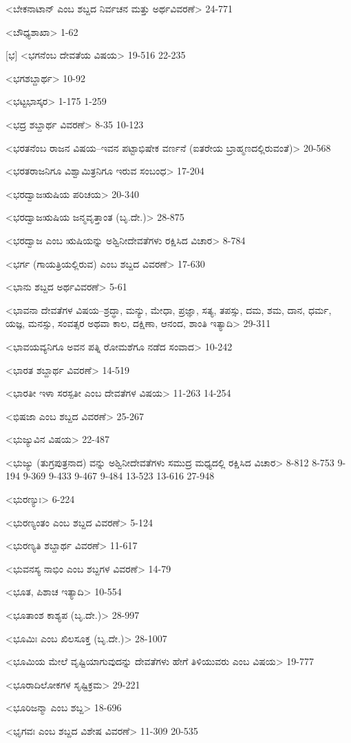 <ಬೇಕನಾಟಾನ್‍ ಎಂಬ ಶಬ್ದದ ನಿರ್ವಚನ ಮತ್ತು ಅರ್ಥವಿವರಣೆ>
24-771

<ಬೌಧ್ಯಶಾಖಾ>
1-62

[ಭ]
<ಭಗನೆಂಬ ದೇವತೆಯ ವಿಷಯ>
19-516 
22-235

<ಭಗಶಬ್ದಾರ್ಥ>
10-92

<ಭಟ್ಟಭಾಸ್ಕರ>
1-175
1-259

<ಭದ್ರ ಶಬ್ದಾರ್ಥ ವಿವರಣೆ>
8-35
10-123

<ಭರತನೆಂಬ ರಾಜನ ವಿಷಯ–ಇವನ ಪಟ್ಟಾಭಿಷೇಕ ವರ್ಣನೆ (ಐತರೇಯ ಬ್ರಾಹ್ಮಣದಲ್ಲಿರುವಂತೆ)>
20-568

<ಭರತರಾಜನಿಗೂ ವಿಶ್ವಾಮಿತ್ರನಿಗೂ ಇರುವ ಸಂಬಂಧ>
17-204

<ಭರದ್ವಾಜಋಷಿಯ ಪರಿಚಯ>
20-340

<ಭರದ್ವಾಜಋಷಿಯ ಜನ್ಮವೃತ್ತಾಂತ (ಬೃ.ದೇ.)>
28-875

<ಭರದ್ವಾಜ ಎಂಬ ಋಷಿಯನ್ನು ಅಶ್ವಿನೀದೇವತೆಗಳು ರಕ್ಷಿಸಿದ ವಿಚಾರ>
8-784

<ಭರ್ಗ (ಗಾಯತ್ರಿಯಲ್ಲಿರುವ) ಎಂಬ ಶಬ್ದದ ವಿವರಣೆ>
17-630

<ಭಾನು ಶಬ್ದದ ಅರ್ಥವಿವರಣೆ>
5-61

<ಭಾವನಾ ದೇವತೆಗಳ ವಿಷಯ–ಶ್ರದ್ಧಾ, ಮನ್ಯು, ಮೇಧಾ, ಪ್ರಜ್ಞಾ, ಸತ್ಯ, ತಪಸ್ಸು, ದಮ, ಶಮ, ದಾನ, ಧರ್ಮ, ಯಜ್ಞ, ಮನಸ್ಸು, ಸಂವತ್ಸರ ಅಥವಾ ಕಾಲ, ದಕ್ಷಿಣಾ, ಆನಂದ, ಶಾಂತಿ ಇತ್ಯಾದಿ>
29-311

<ಭಾವಯವ್ಯನಿಗೂ ಅವನ ಪತ್ನಿ ರೋಮಶೆಗೂ ನಡೆದ ಸಂವಾದ>
10-242

<ಭಾರತ ಶಬ್ದಾರ್ಥ ವಿವರಣೆ>
14-519

<ಭಾರತೀ ಇಳಾ ಸರಸ್ಪತೀ ಎಂಬ ದೇವತೆಗಳ ವಿಷಯ>
11-263 
14-254

<ಭಿಷಜಾ ಎಂಬ ಶಬ್ದದ ವಿವರಣೆ>
25-267

<ಭುಜ್ಯುವಿನ ವಿಷಯ>
22-487

<ಭುಜ್ಯು (ತುಗ್ರಪುತ್ರನಾದ) ವನ್ನು ಅಶ್ವಿನೀದೇವತೆಗಳು ಸಮುದ್ರ ಮಧ್ಯದಲ್ಲಿ ರಕ್ಷಿಸಿದ ವಿಚಾರ>
8-812
8-753
9-194 
9-369 
9-433 
9-467 
9-484
13-523
13-616
27-948

<ಭುರಣ್ಯುಃ>
6-224

<ಭುರಣ್ಯಂತಂ ಎಂಬ ಶಬ್ದದ ವಿವರಣೆ>
5-124

<ಭುರಣ್ಯತಿ ಶಬ್ದಾರ್ಥ ವಿವರಣೆ>
11-617

<ಭುವನಸ್ಯ ನಾಭಿಂ ಎಂಬ ಶಬ್ದಗಳ ವಿವರಣೆ>
14-79

<ಭೂತ, ಪಿಶಾಚ ಇತ್ಯಾದಿ>
10-554

<ಭೂತಾಂಶ ಕಾಶ್ಯಪ (ಬೃ.ದೇ.)>
28-997

<ಭೂಮಿಃ ಎಂಬ ಖಿಲಸೂಕ್ತ (ಬೃ.ದೇ.)>
28-1007

<ಭೂಮಿಯ ಮೇಲೆ ವೃಷ್ಟಿಯಾಗುವುದನ್ನು ದೇವತೆಗಳು ಹೇಗೆ ತಿಳಿಯುವರು ಎಂಬ ವಿಷಯ>
19-777

<ಭೂರಾದಿಲೋಕಗಳ ಸೃಷ್ಟಿಕ್ರಮ>
29-221

<ಭೂರಿಜನ್ಮಾ ಎಂಬ ಶಬ್ದ>
18-696

<ಭೃಗವಃ ಎಂಬ ಶಬ್ದದ ವಿಶೇಷ ವಿವರಣೆ>
11-309 
20-535

